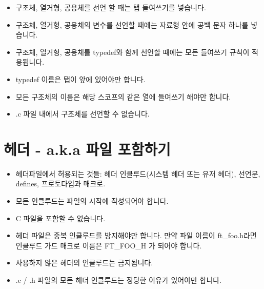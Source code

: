 \documentclass{42-ko}
\begin{document}
        \begin{itemize}

            \item 구조체, 열거형, 공용체를 선언 할 때는 탭 들여쓰기를 넣습니다.

            \item 구조체, 열거형, 공용체의 변수를 선언할 때에는
                자료형 안에 공백 문자 하나를 넣습니다.

            \item 구조체, 열거형, 공용체를 typedef와 함께 선언할 때에는
                모든 들여쓰기 규칙이 적용됩니다.

            \item typedef 이름은 탭이 앞에 있어야만 합니다.

            \item 모든 구조체의 이름은 해당 스코프의 같은 열에 들여쓰기 해야만 합니다.

            \item .c 파일 내에서 구조체를 선언할 수 없습니다.

        \end{itemize}
        \newpage


    \section{헤더 - a.k.a 파일 포함하기}

        \begin{itemize}

            \item 헤더파일에서 허용되는 것들:
                헤더 인클루드(시스템 헤더 또는 유저 헤더),
                선언문, defines, 프로토타입과 매크로.

            \item 모든 인클루드는 파일의 시작에 작성되어야 합니다.

            \item C 파일을 포함할 수 없습니다.

            \item 헤더 파일은 중복 인클루드를 방지해야만 합니다.
                만약 파일 이름이 ft\_foo.h라면 인클루드 가드 매크로 이름은
                FT\_FOO\_H 가 되어야 합니다.

            \item 사용하지 않은 헤더의 인클루드는 금지됩니다.

            \item .c / .h 파일의 모든 헤더 인클루드는 정당한 이유가 있어야만 합니다.

        \end{itemize}
\end{document}
